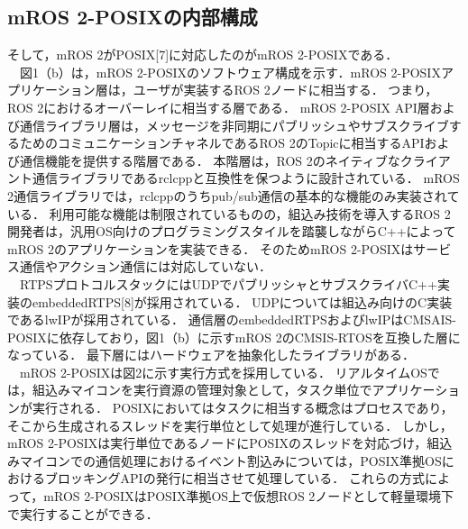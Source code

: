 \subsection{mROS 2-POSIXの内部構成}
そして，mROS 2がPOSIX[7]に対応したのがmROS 2-POSIXである．
\\　図1（b）は，mROS 2-POSIXのソフトウェア構成を示す．mROS 2-POSIXアプリケーション層は，ユーザが実装するROS 2ノードに相当する．
つまり，ROS 2におけるオーバーレイに相当する層である．
mROS 2-POSIX API層および通信ライブラリ層は，メッセージを非同期にパブリッシュやサブスクライブするためのコミュニケーションチャネルであるROS 2のTopicに相当するAPIおよび通信機能を提供する階層である．
本階層は，ROS 2のネイティブなクライアント通信ライブラリであるrclcppと互換性を保つように設計されている．
mROS 2通信ライブラリでは，rclcppのうちpub/sub通信の基本的な機能のみ実装されている．
利用可能な機能は制限されているものの，組込み技術を導入するROS 2開発者は，汎用OS向けのプログラミングスタイルを踏襲しながらC++によってmROS 2のアプリケーションを実装できる．
そのためmROS 2-POSIXはサービス通信やアクション通信には対応していない．
\\　RTPSプロトコルスタックにはUDPでパブリッシャとサブスクライバC++実装のembeddedRTPS[8]が採用されている．
UDPについては組込み向けのC実装であるlwIPが採用されている．
通信層のembeddedRTPSおよびlwIPはCMSAIS-POSIXに依存しており，図1（b）に示すmROS 2のCMSIS-RTOSを互換した層になっている．
最下層にはハードウェアを抽象化したライブラリがある．
\\　mROS 2-POSIXは図2に示す実行方式を採用している．
リアルタイムOSでは，組込みマイコンを実行資源の管理対象として，タスク単位でアプリケーションが実行される．
POSIXにおいてはタスクに相当する概念はプロセスであり，そこから生成されるスレッドを実行単位として処理が進行している．
しかし，mROS 2-POSIXは実行単位であるノードにPOSIXのスレッドを対応づけ，組込みマイコンでの通信処理におけるイベント割込みについては，POSIX準拠OSにおけるブロッキングAPIの発行に相当させて処理している．
これらの方式によって，mROS 2-POSIXはPOSIX準拠OS上で仮想ROS 2ノードとして軽量環境下で実行することができる．
